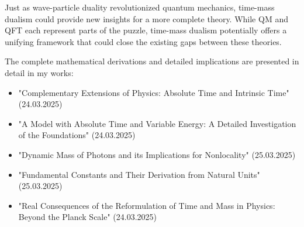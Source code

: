 \documentclass[a4paper,12pt]{article}
\begin{document}
	Just as wave-particle duality revolutionized quantum mechanics, time-mass dualism could provide new insights for a more complete theory. While QM and QFT each represent parts of the puzzle, time-mass dualism potentially offers a unifying framework that could close the existing gaps between these theories.
	
	The complete mathematical derivations and detailed implications are presented in detail in my works:
	
	\begin{itemize}
		\item "Complementary Extensions of Physics: Absolute Time and Intrinsic Time" (24.03.2025)
		\item "A Model with Absolute Time and Variable Energy: A Detailed Investigation of the Foundations" (24.03.2025)
		\item "Dynamic Mass of Photons and its Implications for Nonlocality" (25.03.2025)
		\item "Fundamental Constants and Their Derivation from Natural Units" (25.03.2025)
		\item "Real Consequences of the Reformulation of Time and Mass in Physics: Beyond the Planck Scale" (24.03.2025)
	\end{itemize}
	
\end{document}
